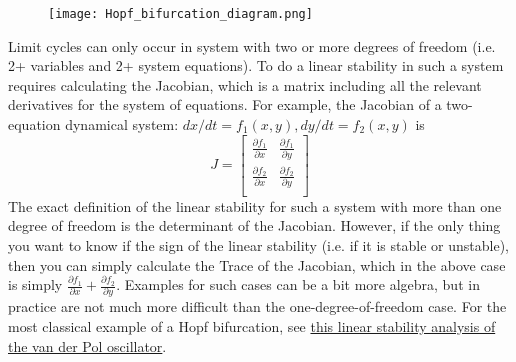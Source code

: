 \documentclass[12pt]{article}
\theoremstyle{definition}
\begin{document}
\begin{figure}[h]
  \begin{center}
\texttt{[image: Hopf\_bifurcation\_diagram.png]}
  \end{center}
\end{figure}

Limit cycles can only occur in system with two or more degrees of freedom (i.e. 2+ variables and 2+ system equations).  To do a linear stability in such a system requires calculating the Jacobian, which is a matrix including all the relevant derivatives for the system of equations. For example, the Jacobian of a two-equation dynamical system: $dx/dt = f_1(x,y), dy/dt = f_2(x,y)$ is 
\begin{equation}
J =
\begin{bmatrix}
  \frac{\partial f_1}{\partial x} & 
    \frac{\partial f_1}{\partial y} \\[1ex] %
  \frac{\partial f_2}{\partial x} & 
    \frac{\partial f_2}{\partial y} \\[1ex]
\end{bmatrix}
\end{equation}
The exact definition of the linear stability for such a system with more than one degree of freedom is the determinant of the Jacobian. However, if the only thing you want to know if the sign of the linear stability (i.e. if it is stable or unstable), then you can simply calculate the Trace of the Jacobian, which in the above case is simply $\frac{\partial f_1}{\partial x} +  \frac{\partial f_2}{\partial y}$. Examples for such cases can be a bit more algebra, but in practice are not much more difficult than the one-degree-of-freedom case. For the most classical example of a Hopf bifurcation, see \href{https://en.wikipedia.org/wiki/Hopf_bifurcation#Propositions}{this linear stability analysis of the van der Pol oscillator}.



\end{document}
